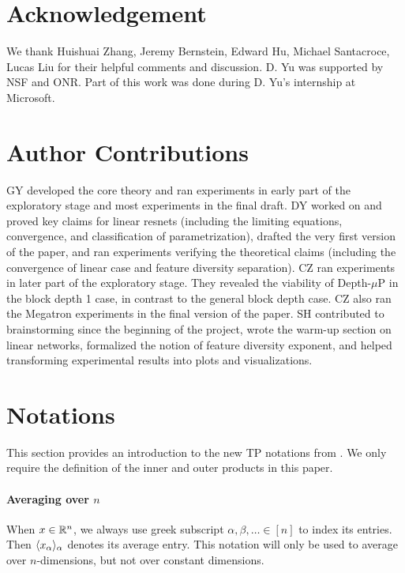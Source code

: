 \documentclass{article}
\theoremstyle{plain}
\theoremstyle{definition}
\begin{document}
 

 
\section*{Acknowledgement}
We thank Huishuai Zhang, Jeremy Bernstein, Edward Hu, Michael Santacroce, Lucas Liu for their helpful comments and discussion. 
D. Yu was supported by NSF and ONR. Part of this work was done during D. Yu's internship at Microsoft. 

\section*{Author Contributions}

GY developed the core theory and ran experiments in early part of the exploratory stage and most experiments in the final draft.
DY worked on and proved key claims for linear resnets (including the limiting equations, convergence, and classification of parametrization), drafted the very first version of the paper, and ran experiments verifying the theoretical claims (including the convergence of linear case and feature diversity separation).
CZ ran experiments in later part of the exploratory stage. They revealed the viability of Depth-$\mu$P in the block depth 1 case, in contrast to the general block depth case.
CZ also ran the Megatron experiments in the final version of the paper.
SH contributed to brainstorming since the beginning of the project, wrote the warm-up section on linear networks, formalized the notion of feature diversity exponent, and helped transforming experimental results into plots and visualizations.
 
\newpage




\newpage

\appendix

\section{Notations}
\label{sec:notations}

This section provides an introduction to the new TP notations from \cite{yang2023tensor}. We only require the definition of the inner and outer products in this paper. 

\paragraph{Averaging over $n$}
When $x \in \mathbb{R}^n$, we always use greek subscript $\alpha, \beta, \ldots \in [n]$ to index its entries.
Then $\langle x_\alpha \rangle_\alpha$ denotes its average entry.
This notation will only be used to average over $n$-dimensions, but not over constant dimensions.
\end{document}
